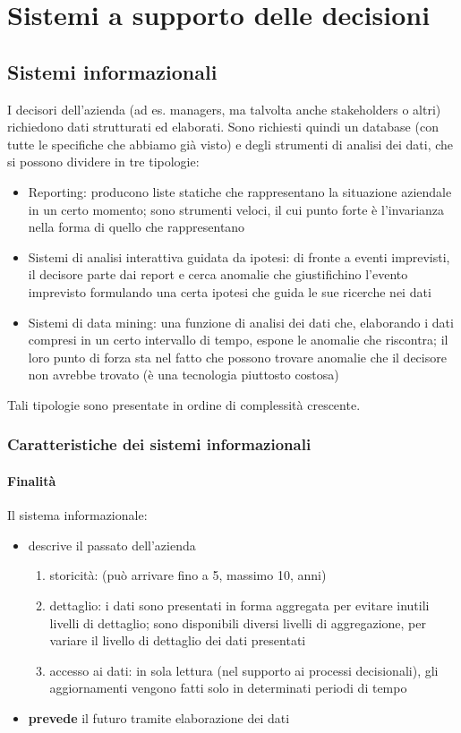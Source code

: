 \chapter{Sistemi a supporto delle decisioni}

\section{Sistemi informazionali}
\label{sec:Sistemi informazionali}
I decisori dell'azienda (ad es. managers, ma talvolta anche stakeholders o altri) richiedono dati strutturati ed elaborati.
Sono richiesti quindi un database (con tutte le specifiche che abbiamo gi\`a visto) e degli strumenti di analisi dei dati, che si possono dividere in tre tipologie:
\begin{itemize}
  \item Reporting: producono liste statiche che rappresentano la situazione aziendale in un certo momento; sono strumenti veloci, il cui punto forte \`e l'invarianza nella forma di quello che rappresentano
  \item Sistemi di analisi interattiva guidata da ipotesi: di fronte a eventi imprevisti, il decisore parte dai report
  e cerca anomalie che giustifichino l'evento imprevisto formulando una certa ipotesi che guida
  le sue ricerche nei dati
  \item Sistemi di data mining: una funzione di analisi dei dati che, elaborando i dati compresi in un certo intervallo
  di tempo, espone le anomalie che riscontra; il loro punto di forza sta nel fatto che possono trovare anomalie che
  il decisore non avrebbe trovato (\`e una tecnologia piuttosto costosa)
\end{itemize}
Tali tipologie sono presentate in ordine di complessit\`a crescente.

\subsection{Caratteristiche dei sistemi informazionali}
\label{sub:Caratteristiche dei sistemi informazionali}
\subsubsection{Finalit\`a}
Il sistema informazionale:
\begin{itemize}
  \item descrive il passato dell'azienda
  \begin{enumerate}
    \item storicit\`a: (pu\`o arrivare fino a 5, massimo 10, anni)
    \item dettaglio: i dati sono presentati in forma aggregata per evitare inutili
    livelli di dettaglio; sono disponibili diversi livelli di aggregazione, per variare
    il livello di dettaglio dei dati presentati
    \item accesso ai dati: in sola lettura (nel supporto ai processi decisionali),
    gli aggiornamenti vengono fatti solo in determinati periodi di tempo
  \end{enumerate}
  \item \textbf{prevede} il futuro tramite elaborazione dei dati
\end{itemize}
